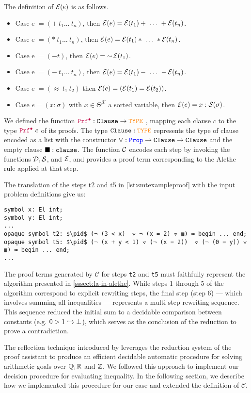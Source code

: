 \begin{definition}
The definition of $\E{e}$ is as follows.
\begin{itemize}
\setlength{\parskip}{0pt}
\item Case e $= (+~t_1\dots~t_n)$, then $\E{e} = \E{t_1} + ~\dots~ +\E{t_n}$.
\item Case e $= (*~t_1\dots~t_n)$, then $\E{e} = \E{t_1} * ~\dots~ *\E{t_n}$.
\item Case e $= (-t)$, then $\E{e} = \mathop{\sim} \E{t_1}$.
\item Case e $= (-~t_1\dots~t_n)$, then $\E{e} = \E{t_1} - ~\dots~ - \E{t_n}$.
\item Case e $= (\approx~t_1~t_2)$ then $\E{e} = (\E{t_1} = \E{t_2})$.
\item Case $e = (x: \sigma )$ with $x \in \Theta^\mathcal{X}$ a sorted variable, then $\E{e} = x: \cal{S}(\sigma)$.
\end{itemize}
\end{definition}

We defined the function $\pid: \tt{Clause} \ra \type$ \cite[\S 3]{ColtellacciMD24}, mapping each clause $c$ to the type $\pid~c$ of its proofs.
The type $\tt{Clause}: \type$ represents the type of clause encoded as a list with the constructor $\veedot: \prop \ra \tt{Clause} \ra \tt{Clause}$ and the empty clause $\nil: \tt{clause}$.
The function $\cal{C}$ encodes each step by invoking the functions $\cal{D},\cal{S}$, and $\cal{E}$, and provides a proof term corresponding to the Alethe rule applied at that step.

\begin{example}
The translation of the steps t2 and t5 in \cref{lst:smtexampleproof} with the input problem definitions give us:
\begin{lstlisting}[language=Lambdapi,mathescape=true]
symbol x: El int;
symbol y: El int;
...
opaque symbol t2: $\pid$ (¬ (3 < x)  ⟇ ¬ (x = 2) ⟇ ▩) ≔ begin ... end;
opaque symbol t5: $\pid$ (¬ (x + y < 1) ⟇ (¬ (x = 2))  ⟇ (¬ (0 = y)) ⟇ ▩) ≔ begin ... end;
...
\end{lstlisting}
\end{example}

The proof terms generated by $\mathcal{C}$ for steps \texttt{t2} and \texttt{t5} must faithfully represent the algorithm presented in \cref{sssect:la-in-alethe}.
While steps 1 through 5 of the algorithm correspond to explicit rewriting steps, the final step (step 6) — which involves summing all inequalities — represents a multi-step rewriting sequence.
This sequence reduced the initial sum to a decidable comparison between constants (e.g. $0 > 1 \re \bot$), which serves as the conclusion of the reduction to prove a contradiction.


The reflection technique introduced by \cite{reflection-origin-coq} leverages the reduction system of the proof assistant to produce an efficient decidable automatic
procedure for solving arithmetic goals over $\bb{Q}, \bb{R}$ and $\bb{Z}$. We followed this approach to implement our decision procedure for evaluating inequality.
In the following section, we describe how we implemented this procedure for our case and extended the definition of $\mathcal{C}$.
